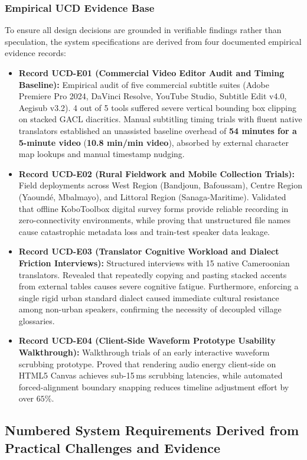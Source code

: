\documentclass[conference]{IEEEtran}
\begin{document}
\subsubsection{Empirical UCD Evidence Base}
\label{sec:design:ucd:evidence}
To ensure all design decisions are grounded in verifiable findings rather than speculation, the system specifications are derived from four documented empirical evidence records:
\begin{itemize}
    \item \textbf{Record UCD-E01 (Commercial Video Editor Audit and Timing Baseline):} Empirical audit of five commercial subtitle suites (Adobe Premiere Pro 2024, DaVinci Resolve, YouTube Studio, Subtitle Edit v4.0, Aegisub v3.2). 4 out of 5 tools suffered severe vertical bounding box clipping on stacked GACL diacritics. Manual subtitling timing trials with fluent native translators established an unassisted baseline overhead of \textbf{54 minutes for a 5-minute video} (\textbf{10.8 min/min video}), absorbed by external character map lookups and manual timestamp nudging.
    \item \textbf{Record UCD-E02 (Rural Fieldwork and Mobile Collection Trials):} Field deployments across West Region (Bandjoun, Bafoussam), Centre Region (Yaound\'e, Mbalmayo), and Littoral Region (Sanaga-Maritime). Validated that offline KoboToolbox digital survey forms provide reliable recording in zero-connectivity environments, while proving that unstructured file names cause catastrophic metadata loss and train-test speaker data leakage.
    \item \textbf{Record UCD-E03 (Translator Cognitive Workload and Dialect Friction Interviews):} Structured interviews with 15 native Cameroonian translators. Revealed that repeatedly copying and pasting stacked accents from external tables causes severe cognitive fatigue. Furthermore, enforcing a single rigid urban standard dialect caused immediate cultural resistance among non-urban speakers, confirming the necessity of decoupled village glossaries.
    \item \textbf{Record UCD-E04 (Client-Side Waveform Prototype Usability Walkthrough):} Walkthrough trials of an early interactive waveform scrubbing prototype. Proved that rendering audio energy client-side on HTML5 Canvas achieves sub-15\,ms scrubbing latencies, while automated forced-alignment boundary snapping reduces timeline adjustment effort by over $65\%$.
\end{itemize}

\subsection{Numbered System Requirements Derived from Practical Challenges and Evidence}
\label{sec:design:requirements}
\end{document}
